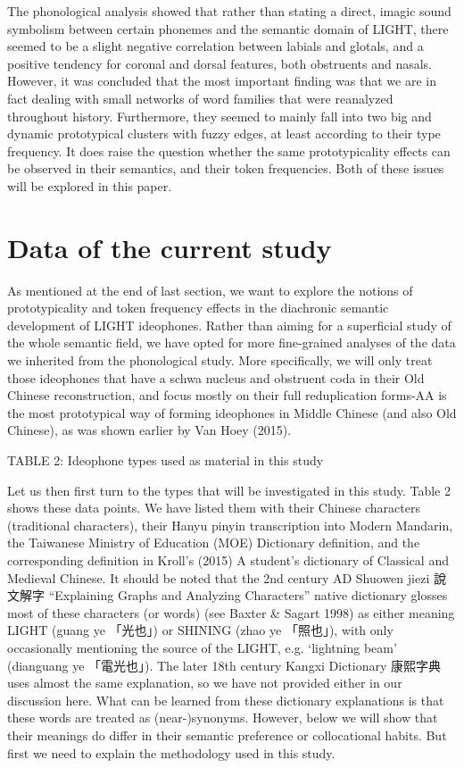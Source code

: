 The phonological analysis showed that rather than stating a direct,
imagic sound symbolism between certain phonemes and the semantic domain
of LIGHT, there seemed to be a slight negative correlation between
labials and glotals, and a positive tendency for coronal and dorsal
features, both obstruents and nasals. However, it was concluded that the
most important finding was that we are in fact dealing with small
networks of word families that were reanalyzed throughout history.
Furthermore, they seemed to mainly fall into two big and dynamic
prototypical clusters with fuzzy edges, at least according to their type
frequency. It does raise the question whether the same prototypicality
effects can be observed in their semantics, and their token frequencies.
Both of these issues will be explored in this paper.

\section{Data of the current study}\label{data-of-the-current-study}

As mentioned at the end of last section, we want to explore the notions
of prototypicality and token frequency effects in the diachronic
semantic development of LIGHT ideophones. Rather than aiming for a
superficial study of the whole semantic field, we have opted for more
fine-grained analyses of the data we inherited from the phonological
study. More specifically, we will only treat those ideophones that have
a schwa nucleus and obstruent coda in their Old Chinese reconstruction,
and focus mostly on their full reduplication forms-AA is the most
prototypical way of forming ideophones in Middle Chinese (and also Old
Chinese), as was shown earlier by Van Hoey (2015).

TABLE 2: Ideophone types used as material in this study

Let us then first turn to the types that will be investigated in this
study. Table 2 shows these data points. We have listed them with their
Chinese characters (traditional characters), their Hanyu pinyin
transcription into Modern Mandarin, the Taiwanese Ministry of Education
(MOE) Dictionary definition, and the corresponding definition in Kroll's
(2015) A student's dictionary of Classical and Medieval Chinese. It
should be noted that the 2nd century AD Shuowen jiezi 說文解字
``Explaining Graphs and Analyzing Characters'' native dictionary glosses
most of these characters (or words) (see Baxter \& Sagart 1998) as
either meaning LIGHT (guang ye 「光也」) or SHINING (zhao ye 「照也」),
with only occasionally mentioning the source of the LIGHT, e.g.
`lightning beam' (dianguang ye 「電光也」). The later 18th century
Kangxi Dictionary 康熙字典 uses almost the same explanation, so we have
not provided either in our discussion here. What can be learned from
these dictionary explanations is that these words are treated as
(near-)synonyms. However, below we will show that their meanings do
differ in their semantic preference or collocational habits. But first
we need to explain the methodology used in this study.

